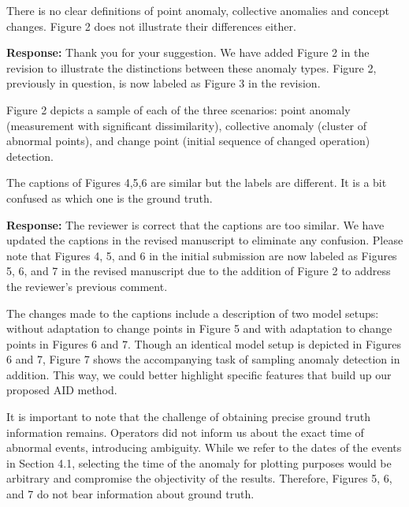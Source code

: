 \documentclass{article}
\makeatletter
\newenvironment{comment}{
\begin{sloppypar}\slshape
\vspace{5 mm}
\color{blue}
 \@beginparpenalty\@M
  \begin{list}{}{\setlength{\topsep}{0ex}%
  \setlength{\leftmargin}{\rightmargin}}\item[]
 \@beginparpenalty\@endparpenalty
}
{\end{list}
\end{sloppypar}
}
\makeatother
\begin{document}
\begin{enumerate}

  \item
        \begin{comment}
        There is no clear definitions of point anomaly, collective anomalies and concept changes. Figure 2 does not illustrate their differences either.
        \end{comment}
        {\bf Response:}
        Thank you for your suggestion. We have added Figure 2 in the revision to illustrate the distinctions between these anomaly types. Figure 2, previously in question, is now labeled as Figure 3 in the revision.

        Figure 2 depicts a sample of each of the three scenarios: point anomaly (measurement with significant dissimilarity), collective anomaly (cluster of abnormal points), and change point (initial sequence of changed operation) detection.

  \item
        \begin{comment}
        The captions of Figures 4,5,6 are similar but the labels are different. It is a bit confused as which one is the ground truth.
        \end{comment}
        {\bf Response:}
        The reviewer is correct that the captions are too similar. We have updated the captions in the revised manuscript to eliminate any confusion. Please note that Figures 4, 5, and 6 in the initial submission are now labeled as Figures 5, 6, and 7 in the revised manuscript due to the addition of Figure 2 to address the reviewer's previous comment.

        The changes made to the captions include a description of two model setups: without adaptation to change points in Figure 5 and with adaptation to change points in Figures 6 and 7. Though an identical model setup is depicted in Figures 6 and 7, Figure 7 shows the accompanying task of sampling anomaly detection in addition. This way, we could better highlight specific features that build up our proposed AID method.

        It is important to note that the challenge of obtaining precise ground truth information remains. Operators did not inform us about the exact time of abnormal events, introducing ambiguity. While we refer to the dates of the events in Section 4.1, selecting the time of the anomaly for plotting purposes would be arbitrary and compromise the objectivity of the results. Therefore, Figures 5, 6, and 7 do not bear information about ground truth.


\end{enumerate}
\end{document}
